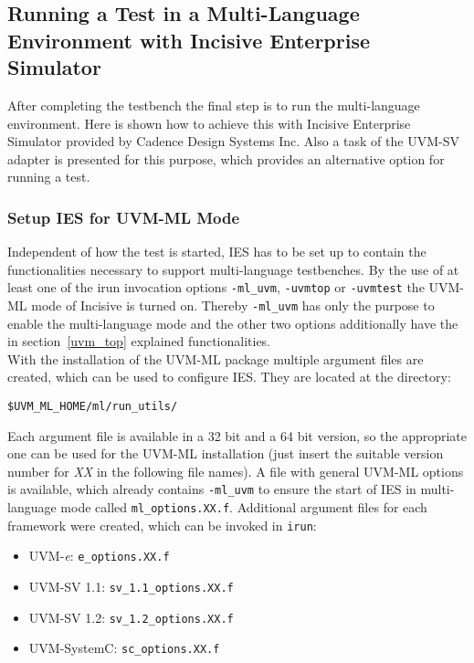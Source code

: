 \subsection{Running a Test in a Multi-Language Environment with Incisive Enterprise Simulator}

After completing the testbench the final step is to run the multi-language environment. Here is shown how to achieve
this with Incisive Enterprise Simulator provided by Cadence Design Systems Inc. Also a task of the
UVM-SV adapter is presented for this purpose, which provides an alternative option for running a test.

\subsubsection{Setup IES for UVM-ML Mode}
Independent of how the test is started, IES has to be set up to contain the functionalities necessary to support multi-language testbenches. By the use of at least one of the irun invocation options \lstinline$-ml_uvm$, \lstinline$-uvmtop$ or \lstinline$-uvmtest$ the UVM-ML mode of Incisive is turned on. Thereby \lstinline$-ml_uvm$ has only the purpose to enable the multi-language mode and the other two options additionally have the in section~\ref{uvm_top} explained functionalities.\\
With the installation of the UVM-ML package multiple argument files are created, which can be used to configure IES. They are located at the directory:
\begin{lstlisting}
$UVM_ML_HOME/ml/run_utils/
\end{lstlisting}
Each argument file is available in a 32 bit and a 64 bit version, so the appropriate one can be used for the UVM-ML installation (just insert the suitable version number for \emph{XX} in the following file names). A file with general UVM-ML options is available, which already contains \lstinline$-ml_uvm$ to ensure the start of IES in multi-language mode called \lstinline$ml_options.XX.f$. Additional argument files for each framework were created, which can be invoked in \lstinline$irun$:
\begin{itemize}
  \item UVM-\textit{e}: \lstinline$e_options.XX.f$
  \item UVM-SV 1.1: \lstinline$sv_1.1_options.XX.f$
  \item UVM-SV 1.2: \lstinline$sv_1.2_options.XX.f$
  \item UVM-SystemC: \lstinline$sc_options.XX.f$
\end{itemize}

